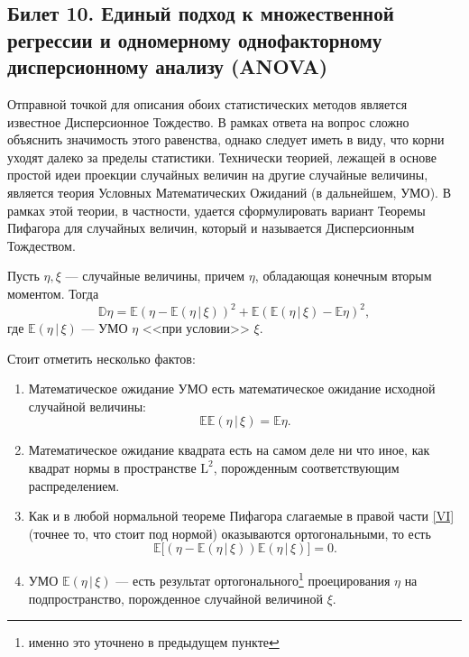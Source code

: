 \subsection{ Билет 10. Единый подход к множественной регрессии и одномерному однофакторному дисперсионному анализу (ANOVA) }

Отправной точкой для описания обоих статистических методов является известное Дисперсионное Тождество.
В рамках ответа на вопрос сложно объяснить значимость этого равенства, однако следует иметь в виду, что корни уходят далеко за пределы статистики.
Технически теорией, лежащей в основе простой идеи проекции случайных величин на другие случайные величины, является теория Условных Математических Ожиданий (в дальнейшем, УМО).
В рамках этой теории, в частности, удается сформулировать вариант Теоремы Пифагора для случайных величин, который и называется Дисперсионным Тождеством.

\begin{thm}
    Пусть $\eta, \xi$ --- случайные величины, причем $\eta$, обладающая конечным вторым моментом.
    Тогда
    \begin{equation}
        \label{VI}
        \mathbb D \eta = \mathbb E(\eta - \mathbb E(\eta\, | \, \xi))^2 + \mathbb E(\mathbb E(\eta\, | \, \xi) - \mathbb E \eta)^2,
    \end{equation}
    где $\mathbb E(\eta \,|\, \xi)$ --- УМО $\eta$ <<при условии>> $\xi$.
\end{thm}

{ \footnotesize
Стоит отметить несколько фактов:
\begin{enumerate}
    \item Математическое ожидание УМО есть математическое ожидание исходной случайной величины:
        \begin{equation}
            \mathbb E \mathbb E(\eta \, | \, \xi) = \mathbb E \eta.
        \end{equation}
    \item Математическое ожидание квадрата есть на самом деле ни что иное, как квадрат нормы в пространстве $\mathrm L^2$, порожденным соответствующим распределением.
    \item Как и в любой нормальной теореме Пифагора слагаемые в правой части \eqref{VI} (точнее то, что стоит под нормой) оказываются ортогональными, то есть
        \begin{equation}
            \mathbb E [ (\eta - \mathbb E(\eta\, | \, \xi)) \mathbb E(\eta\, | \, \xi) \big ] = 0.
        \end{equation}
    \item УМО $\mathbb E(\eta \, | \, \xi)$ --- есть результат ортогонального\footnote{именно это уточнено в предыдущем пункте} проецирования
        $\eta$ на подпространство, порожденное случайной величиной $\xi$.
\end{enumerate}
}

